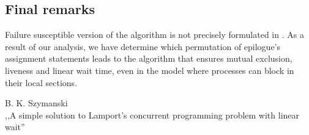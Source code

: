 
\subsection*{Final remarks}

Failure susceptible version of the algorithm is not precisely formulated in \cite{Original}.
As a result of our analysis, we have determine which permutation of epilogue's assignment statements leads to the algorithm that ensures mutual exclusion, liveness and linear wait time, even in the model where processes can block in their local sections.


\begin{thebibliography}{9}
   B. K. Szymanski \\
    \newblock ,,A simple solution to Lamport's concurrent programming problem with linear wait''
\end{thebibliography}


